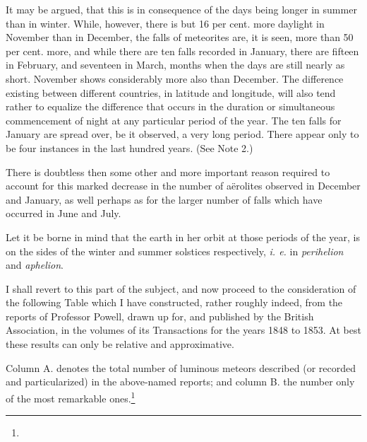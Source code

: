 \documentclass[a4paper, 12pt, oneside]{article}
\begin{document}
It may be argued, that this is in consequence of the days being longer in summer than in winter. While, however, there is but 16 per cent. more daylight in November than in December, the falls of meteorites are, it is seen, more than 50 per cent. more, and while there are ten falls recorded in January, there are fifteen in February, and seventeen in March, months when the days are still nearly as short. November shows considerably more also than December. The difference existing between different countries, in latitude and longitude, will also tend rather to equalize the difference that occurs in the duration or simultaneous commencement of night at any particular period of the year. The ten falls for January are spread over, be it observed, a very long period. There appear only to be four instances in the last hundred years. (See Note 2.)

There is doubtless then some other and more important reason required to account for this marked decrease in the number of aërolites observed in December and January, as well perhaps as for the larger number of falls which have occurred in June and July.

Let it be borne in mind that the earth in her orbit at those periods of the year, is on the sides of the winter and summer solstices respectively, \emph{i. e.} in \emph{perihelion} and \emph{aphelion}.

I shall revert to this part of the subject, and now proceed to the consideration of the following Table which I have constructed, rather roughly indeed, from the reports of Professor Powell, drawn up for, and published by the British Association, in the volumes of its Transactions for the years 1848 to 1853. At best these results can only be relative and approximative.

Column A. denotes the total number of luminous meteors described (or recorded and particularized) in the above-named reports; and column B. the number only of the most remarkable ones.\footnote{}
\end{document}
